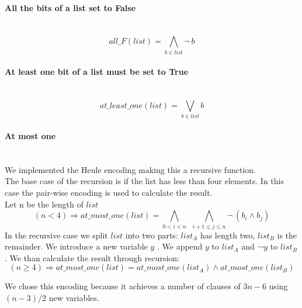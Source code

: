   \paragraph*{All the bits of a list set to False} \hfill \\
    \begin{equation}
      all\_F(list) = \bigwedge_{b \in list}\neg \ b
    \end{equation}
  
    \paragraph*{At least one bit of a list must be set to True} \hfill \\
    \begin{equation}
      at\_least\_one(list) = \bigvee_{b \in list} b
    \end{equation}

  \paragraph*{At most one} \hfill \\
    We implemented the Heule encoding making this a recursive function.\\
    The base case of the recursion is if the list has less than four elements. In this case the 
    pair-wise encoding is used to calculate the result.\\
    Let n be the length of \(list\) 
    \begin{equation}
            (n < 4) \Longrightarrow at\_most\_one(list) = \bigwedge_{0 < i < n} \ \ \bigwedge_{i+1 \leq j \leq n}\neg \ (b_i \land b_j)
    \end{equation}
    In the recursive case we split \(list\)  into two parts: \(list_A\)  has length two, \(list_B\)  is
    the remainder. We introduce a new variable \(y\) . We append \(y\)  to \(list_A\)  and ¬\( y\)  to 
    \(list_B\) . We than calculate the result through recursion:
    \begin{equation}
        (n \geq 4) \Longrightarrow at\_most\_one(list) = at\_most\_one(list_A) \land at\_most\_one(list_B)
    \end{equation}

    We chose this encoding because it achieves a number of clauses of \(3n - 6\)  using \((n-3)/2\) new variables. \\

